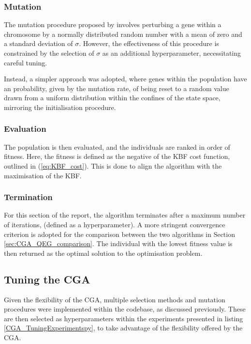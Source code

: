 \documentclass[10pt]{article}
\begin{document}
\begin{multicols}{2}
\subsubsection{Mutation}

The mutation procedure proposed by \cite{PGA} involves perturbing a gene within a chromosome by a normally distributed random number with a mean of zero and a standard deviation of $\sigma$. However, the effectiveness of this procedure is constrained by the selection of $\sigma$ as an additional hyperparameter, necessitating careful tuning. 

Instead, a simpler approach was adopted, where genes within the population have an probability, given by the mutation rate, of being reset to a random value drawn from a uniform distribution within the confines of the state space, mirroring the initialisation procedure.

\subsubsection{Evaluation}

The population is then evaluated, and the individuals are ranked in order of fitness. Here, the fitness is defined as the negative of the KBF cost function, outlined in (\ref{eq:KBF_cost}). This is done to align the algorithm with the maximisation of the KBF.

\subsubsection{Termination}

For this section of the report, the algorithm terminates after a maximum number of iterations, (defined as a hyperparameter). A more stringent convergence criterion is adopted for the comparison between the two algorithms in Section \ref{sec:CGA_QEG_comparison}. The individual with the lowest fitness value is then returned as the optimal solution to the optimisation problem.

\subsection{Tuning the CGA}
\label{sec:CGA_selection_mutation}

Given the flexibility of the CGA, multiple selection methods and mutation procedures were implemented within the codebase, as discussed previously. These are then selected as hyperparameters within the experiments presented in listing \ref{CGA_TuningExperimentspy}, to take advantage of the flexibility offered by the CGA. 


\end{multicols}
\end{document}
